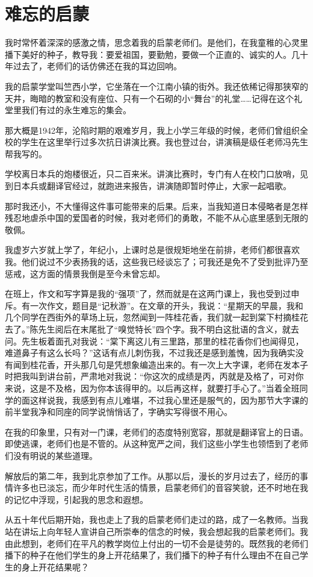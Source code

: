 \documentclass[12pt,UTF-8,openany]{ctexbook}
\begin{document}
\chapter{难忘的启蒙}

\begin{Large}
    
    我时常怀着深深的感激之情，思念着我的启蒙老师们。是他们，在我童稚的心灵里播下美好的种子，教导我：要爱祖国，要勤勉，要做一个正直的、诚实的人。几十年过去了，老师们的话仿佛还在我的耳边回响。
    
    我的启蒙学堂叫竺西小学，它坐落在一个江南小镇的街外。我还依稀记得那狭窄的天井，晦暗的教室和没有座位、只有一个石砌的小“舞台”的礼堂……记得在这个礼堂里我们有过的永生难忘的集会。
    
    那大概是1942年，沦陷时期的艰难岁月，我上小学三年级的时候，老师们曾组织全校的学生在这里举行过多次抗日讲演比赛。我也登过台，讲演稿是级任老师冯先生帮我写的。
    
    学校离日本兵的炮楼很近，只二百来米。讲演比赛时，专门有人在校门口放哨，见到日本兵或翻译官经过，就跑进来报告，讲演随即暂时停止，大家一起唱歌。
    
    那时我还小，不大懂得这件事可能带来的后果。后来，当我知道日本侵略者是怎样残忍地虐杀中国的爱国者的时候，我对老师们的勇敢，不能不从心底里感到无限的敬佩。
    
    我虚岁六岁就上学了，年纪小，上课时总是很规矩地坐在前排，老师们都很喜欢我。他们说过不少表扬我的话，这些我已经谈忘了；可我还是免不了受到批评乃至惩戒，这方面的情景我倒是至今未曾忘却。
    
    在班上，作文和写字算是我的“强项”了，然而就是在这两门课上，我也受到过申斥。有一次作文，题目是“记秋游”。在文章的开头，我说：“星期天的早晨，我和几个同学在西街外的草场上玩，忽然闻到一阵桂花香，我们就一起到棠下村摘桂花去了。”陈先生阅后在末尾批了“嗅觉特长”四个字。我不明白这批语的含义，就去问。先生板着面孔对我说：“棠下离这儿有三里路，那里的桂花香你们也闻得见，难道鼻子有这么长吗？”这话有点儿刺伤我，不过我还是感到羞愧，因为我确实没有闻到桂花香，开头那几句是凭想象编造出来的。有一次上大字课，老师在发本子时把我叫到讲台前，严肃地对我说：“你这次的成绩是丙，丙就是及格了，可对你来说，这是不及格，因为你本该得甲的。以后再这样，就要打手心了。”当着全班同学的面这样说我，我感到有点儿难堪，不过我心里还是服气的，因为那节大字课的前半堂我净和同座的同学说悄悄话了，字确实写得很不用心。
    
    在我的印象里，只有对一门课，老师们的态度特别宽容，那就是翻译官上的日语。即使逃课，老师们也是不管的。从这种宽严之间，我们这些小学生也领悟到了老师们没有明说的某些道理。
    
    解放后的第二年，我到北京参加了工作。从那以后，漫长的岁月过去了，经历的事情许多也已淡忘，而少年时代生活的情景，启蒙老师们的音容笑貌，还不时地在我的记忆中浮现，引起我的思念和遐想。
    
    从五十年代后期开始，我也走上了我的启蒙老师们走过的路，成了一名教师。当我站在讲坛上向年轻人宣讲自己所崇奉的信念的时候，我会想起我的启蒙老师们。我由此想到，老师们在平凡的教学岗位上付出的一切不会是徒劳的。既然我的老师们播下的种子在他们学生的身上开花结果了，我们播下的种子有什么理由不在自己学生的身上开花结果呢？
    
\end{Large}
\end{document}
